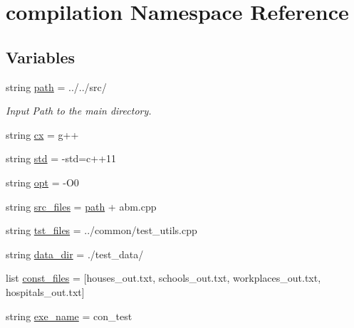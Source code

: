 \hypertarget{namespacecompilation}{}\section{compilation Namespace Reference}
\label{namespacecompilation}
\subsection*{Variables}
\begin{DoxyCompactItemize}
\item 
string \hyperlink{namespacecompilation_a3e72f84f29fb2f8b2a01891b25334512}{path} = \textquotesingle{}../../src/\textquotesingle{}
\begin{DoxyCompactList}\small\item\em Input Path to the main directory. \end{DoxyCompactList}\item 
string \hyperlink{namespacecompilation_ad0f846bbbc95dcce53b9f00d8c807571}{cx} = \textquotesingle{}g++\textquotesingle{}
\item 
string \hyperlink{namespacecompilation_a762bca1fba31c18bcb62094e66cd2aa2}{std} = \textquotesingle{}-\/std=c++11\textquotesingle{}
\item 
string \hyperlink{namespacecompilation_a57efc23010b24292a9208b55ff35c3e8}{opt} = \textquotesingle{}-\/O0\textquotesingle{}
\item 
string \hyperlink{namespacecompilation_a10d70893afdbc9620e6bd6d4b65b263c}{src\+\_\+files} = \hyperlink{namespacecompilation_a3e72f84f29fb2f8b2a01891b25334512}{path} + \textquotesingle{}abm.\+cpp\textquotesingle{}
\item 
string \hyperlink{namespacecompilation_afc391618d31035167addaa7c490b4b83}{tst\+\_\+files} = \textquotesingle{}../common/test\+\_\+utils.\+cpp\textquotesingle{}
\item 
string \hyperlink{namespacecompilation_a9a1debd6f944e917f85b5a30295869e0}{data\+\_\+dir} = \textquotesingle{}./test\+\_\+data/\textquotesingle{}
\item 
list \hyperlink{namespacecompilation_a8cabbc261586d969f95f53439b9c7f06}{const\+\_\+files} = \mbox{[}\textquotesingle{}houses\+\_\+out.\+txt\textquotesingle{}, \textquotesingle{}schools\+\_\+out.\+txt\textquotesingle{}, \textquotesingle{}workplaces\+\_\+out.\+txt\textquotesingle{}, \textquotesingle{}hospitals\+\_\+out.\+txt\textquotesingle{}\mbox{]}
\item 
string \hyperlink{namespacecompilation_afbfcd1e8d9e1c7a3d1bed4a27abe8b72}{exe\+\_\+name} = \textquotesingle{}con\+\_\+test\textquotesingle{}

\end{DoxyCompactItemize}
